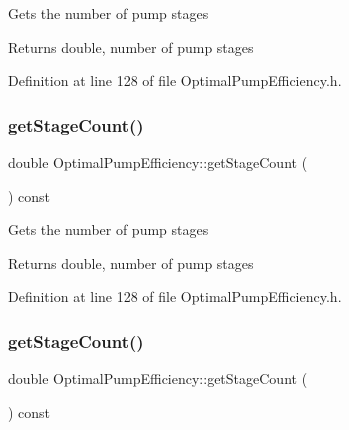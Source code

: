 Gets the number of pump stages

\begin{DoxyReturn}{Returns}
double, number of pump stages 
\end{DoxyReturn}


Definition at line 128 of file Optimal\+Pump\+Efficiency.\+h.

\mbox{\label{class_optimal_pump_efficiency_aac0c1a4a6492bf00b245c2a61d100eaa}} 
\subsubsection{\texorpdfstring{get\+Stage\+Count()}{getStageCount()}\hspace{0.1cm}{\footnotesize\ttfamily [2/3]}}
{\footnotesize\ttfamily double Optimal\+Pump\+Efficiency\+::get\+Stage\+Count (\begin{DoxyParamCaption}{ }\end{DoxyParamCaption}) const\hspace{0.3cm}{\ttfamily [inline]}}

Gets the number of pump stages

\begin{DoxyReturn}{Returns}
double, number of pump stages 
\end{DoxyReturn}


Definition at line 128 of file Optimal\+Pump\+Efficiency.\+h.

\mbox{\label{class_optimal_pump_efficiency_aac0c1a4a6492bf00b245c2a61d100eaa}} 
\subsubsection{\texorpdfstring{get\+Stage\+Count()}{getStageCount()}\hspace{0.1cm}{\footnotesize\ttfamily [3/3]}}
{\footnotesize\ttfamily double Optimal\+Pump\+Efficiency\+::get\+Stage\+Count (\begin{DoxyParamCaption}{ }\end{DoxyParamCaption}) const\hspace{0.3cm}{\ttfamily [inline]}}

